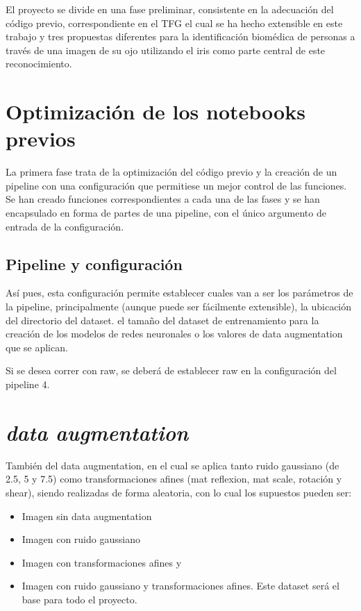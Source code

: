  \label{capitulo5}

El proyecto se divide en una fase preliminar, consistente en la adecuación del código previo, correspondiente en el TFG
el cual se ha hecho extensible en este trabajo y tres propuestas diferentes para la identificación biomédica de personas 
a través de una imagen de su ojo utilizando el iris como parte central de este reconocimiento.

\section{Optimización de los notebooks previos}

La primera fase trata de la optimización del código previo y la creación de un pipeline con una configuración que permitiese un mejor control de las funciones.
Se han creado funciones correspondientes a cada una de las fases y se han encapsulado en forma de partes de una pipeline, con el único argumento de entrada de la 
configuración. 


\subsection{Pipeline y configuración} 

Así pues, esta configuración permite establecer cuales van a ser los parámetros de la pipeline, principalmente (aunque puede ser fácilmente extensible),
 la ubicación del directorio del dataset. el tamaño del dataset de entrenamiento para la creación de los modelos de redes neuronales o los valores
 de data augmentation que se aplican.

 Si se desea correr con raw, se deberá de establecer raw en la configuración del pipeline 4.

\section{\textit{data augmentation}}

También del  data augmentation, en el cual se aplica tanto ruido gaussiano (de 2.5, 5 y 7.5) como transformaciones afines (mat reflexion, mat scale, rotación y shear), siendo realizadas de 
forma aleatoria, con lo cual los supuestos pueden ser:

\begin{itemize}
    \item Imagen sin data augmentation
    \item Imagen con ruido gaussiano
    \item Imagen con transformaciones afines y 
    \item Imagen con ruido gaussiano y transformaciones afines. Este dataset será el base para todo el proyecto.
\end{itemize}

